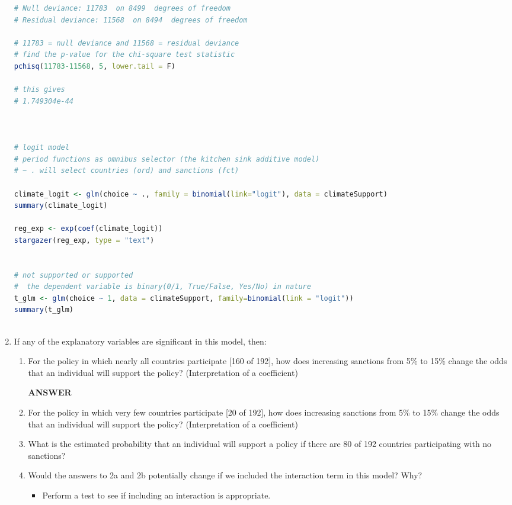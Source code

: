 \documentclass[12pt,letterpaper]{article}
\begin{document}
\begin{enumerate}
\begin{lstlisting}[language=R]
# Null deviance: 11783  on 8499  degrees of freedom
# Residual deviance: 11568  on 8494  degrees of freedom

# 11783 = null deviance and 11568 = residual deviance
# find the p-value for the chi-square test statistic
pchisq(11783-11568, 5, lower.tail = F) 

# this gives
# 1.749304e-44 



# logit model
# period functions as omnibus selector (the kitchen sink additive model)
# ~ . will select countries (ord) and sanctions (fct)

climate_logit <- glm(choice ~ ., family = binomial(link="logit"), data = climateSupport)
summary(climate_logit)

reg_exp <- exp(coef(climate_logit))
stargazer(reg_exp, type = "text")


# not supported or supported
#  the dependent variable is binary(0/1, True/False, Yes/No) in nature
t_glm <- glm(choice ~ 1, data = climateSupport, family=binomial(link = "logit"))
summary(t_glm)
	
	\end{lstlisting}
	
	
	\item
	If any of the explanatory variables are significant in this model, then:
	\begin{enumerate}
		\item
		For the policy in which nearly all countries participate [160 of 192], how does increasing sanctions from 5\% to 15\% change the odds that an individual will support the policy? (Interpretation of a coefficient)
		
		{\bf ANSWER}
		
		
		
		\item
		For the policy in which very few countries participate [20 of 192], how does increasing sanctions from 5\% to 15\% change the odds that an individual will support the policy? (Interpretation of a coefficient)
		\item
		What is the estimated probability that an individual will support a policy if there are 80 of 192 countries participating with no sanctions? 
		\item
		Would the answers to 2a and 2b potentially change if we included the interaction term in this model? Why? 
		\begin{itemize}
			\item Perform a test to see if including an interaction is appropriate.
		\end{itemize}
	\end{enumerate}
	\end{enumerate}
\end{document}
